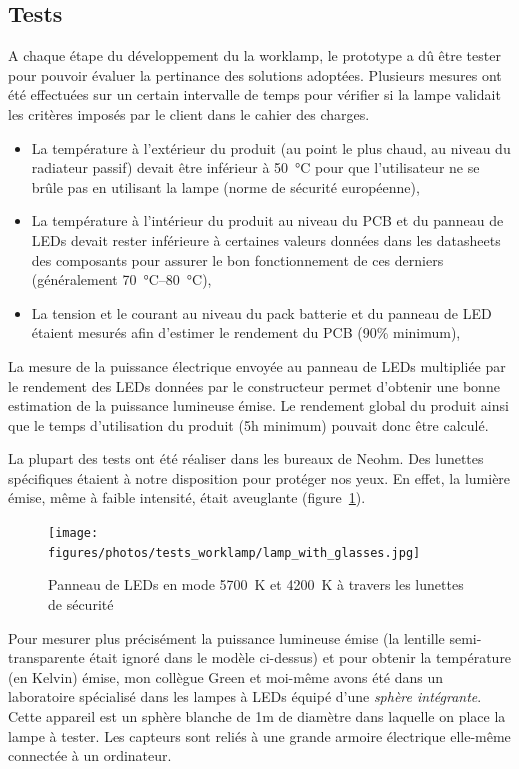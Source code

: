 \documentclass[a4paper, 12pt, sffamily]{report}
\begin{document}
\subsection{Tests}
A chaque étape du développement du la worklamp, le prototype a dû  être tester pour pouvoir évaluer la pertinance des solutions adoptées. Plusieurs mesures ont été effectuées sur un certain intervalle de temps pour vérifier si la lampe validait les critères imposés par le client dans le cahier des charges.
\begin{itemize} %
\item La température à l'extérieur du produit (au point le plus chaud, au niveau du radiateur passif) devait être inférieur à \SI{50}{\celsius} pour que l'utilisateur ne se brûle pas en utilisant la lampe (norme de sécurité européenne),
\item La température à l'intérieur du produit au niveau du PCB et du panneau de LEDs devait rester inférieure à certaines valeurs données dans les datasheets des composants pour assurer le bon fonctionnement de ces derniers (généralement \SIrange{70}{80}{\celsius}),
\item La tension et le courant au niveau du pack batterie et du panneau de LED étaient mesurés afin d'estimer le rendement du PCB (90\% minimum),
\end{itemize}
La mesure de la puissance électrique envoyée au panneau de LEDs multipliée par le rendement des LEDs données par le constructeur permet d'obtenir une bonne estimation de la puissance lumineuse émise. Le rendement global du produit ainsi que le temps d'utilisation du produit (5h minimum) pouvait donc être calculé.

La plupart des tests ont été réaliser dans les bureaux de Neohm. Des lunettes spécifiques étaient à notre disposition pour protéger nos yeux. En effet, la lumière émise, même à faible intensité, était aveuglante (figure~\ref{fig:lamp_with_glasses}).

\begin{figure}[h]
\centering
\texttt{[image: figures/photos/tests\_worklamp/lamp\_with\_glasses.jpg]}
\caption{Panneau de LEDs en mode \SI{5700}{\kelvin} et \SI{4200}{\kelvin} à travers les lunettes de sécurité}
\label{fig:lamp_with_glasses}
\end{figure}

Pour mesurer plus précisément la puissance lumineuse émise (la lentille semi-transparente était ignoré dans le modèle ci-dessus) et pour obtenir la température (en Kelvin) émise, mon collègue Green et moi-même avons été dans un laboratoire spécialisé dans les lampes à LEDs équipé d'une \emph{sphère intégrante}. Cette appareil est un sphère blanche de 1m de diamètre dans laquelle on place la lampe à tester. Les capteurs sont reliés à une grande armoire électrique elle-même connectée à un ordinateur.
\end{document}
